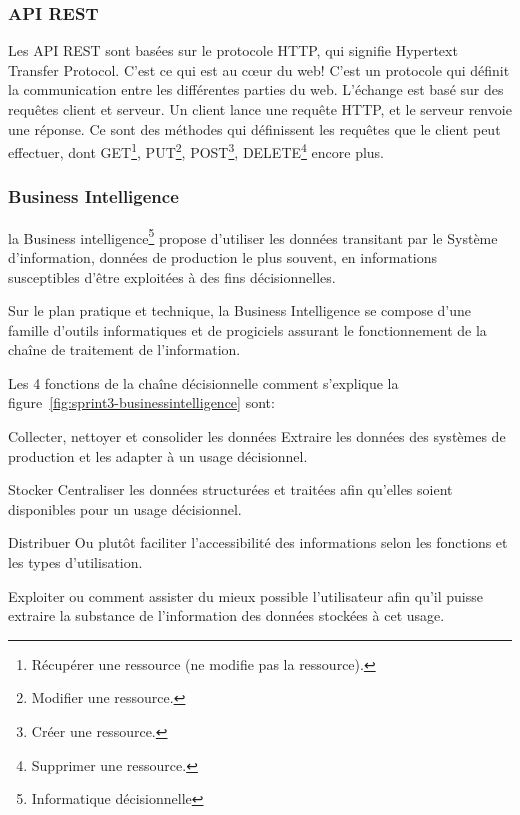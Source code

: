 \subsubsection{API REST}
Les API REST sont basées sur le protocole HTTP, qui signifie Hypertext Transfer Protocol.
C’est ce qui est au cœur du web! C’est un protocole qui définit la communication
entre les différentes parties du web. L’échange est basé sur des requêtes client et serveur.
Un client lance une requête HTTP, et le serveur renvoie une réponse.
Ce sont des méthodes qui définissent les requêtes que le client peut effectuer,
dont GET\footnote{Récupérer une ressource (ne modifie pas la ressource).}, PUT\footnote{Modifier une ressource.},
POST\footnote{Créer une ressource.}, DELETE\footnote{Supprimer une ressource.} encore plus.

\subsubsection{Business Intelligence}

la Business intelligence\footnote{Informatique décisionnelle} propose d'utiliser
les données transitant par le Système
d'information, données de production le plus souvent, en informations susceptibles
d'être exploitées à des fins décisionnelles.

Sur le plan pratique et technique, la Business Intelligence se compose d'une famille
d'outils informatiques et
de progiciels assurant le fonctionnement de la chaîne de traitement de l'information.

Les 4 fonctions de la chaîne décisionnelle comment s'explique la figure~\ref{fig:sprint3-businessintelligence} sont:
\begin{description}[align=right,labelwidth=1cm]
 \item [1] Collecter, nettoyer et consolider les données Extraire les données
 des systèmes de production et les adapter à un usage décisionnel.
 \item [2] Stocker Centraliser les données structurées et traitées afin qu'elles
 soient disponibles pour un usage décisionnel.
 \item [3] Distribuer Ou plutôt faciliter l'accessibilité des informations selon
 les fonctions et les types d'utilisation.
 \item [4] Exploiter ou comment assister du mieux possible l'utilisateur afin qu'il puisse extraire
 la substance de l'information des données stockées à cet usage.
\end{description}
\clearpage

